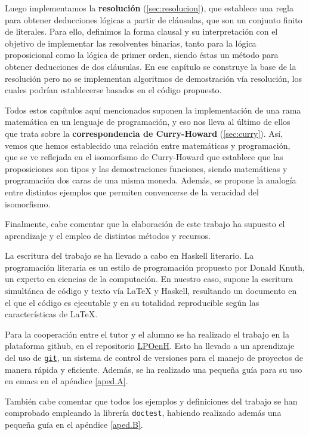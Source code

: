 Luego implementamos la \textbf{resolución} (\ref{sec:resolucion}), que establece una regla para obtener deducciones lógicas a partir de cláusulas, que son un conjunto finito de literales. Para ello, definimos la forma clausal y su interpretación con el objetivo de implementar las resolventes binarias, tanto para la lógica proposicional como la lógica de primer orden, siendo éstas un método para obtener deducciones de dos cláusulas. En ese capítulo se construye la base de la resolución pero no se
implementan algoritmos de demostración vía resolución, los cuales podrían establecerse
basados en el código propuesto. 
  
Todos estos capítulos aquí mencionados suponen la implementación de una rama matemática
en un lenguaje de programación, y eso nos lleva al último de ellos que trata sobre
la \textbf{correspondencia de Curry-Howard} (\ref{sec:curry}). Así, vemos que hemos
establecido una relación entre matemáticas y programación, que se ve reflejada
en el isomorfismo de Curry-Howard que establece que las proposiciones son tipos y
las demostraciones funciones, siendo matemáticas y programación dos caras de una misma
moneda. Además, se propone la analogía entre distintos ejemplos que permiten convencerse
de la veracidad del isomorfismo. 

\vspace{3mm}

Finalmente, cabe comentar que la elaboración de este trabajo ha supuesto el aprendizaje
y el empleo de distintos métodos y recursos.

La escritura del trabajo se ha llevado a cabo en Haskell literario. La programación
literaria es un estilo de programación propuesto por Donald Knuth, un experto en
ciencias de la computación. En nuestro caso, supone la escritura simultánea de código
y texto vía LaTeX y Haskell, resultando un documento en el que el código es ejecutable
y en su totalidad reproducible según las características de LaTeX. 

Para la cooperación entre el tutor y el alumno se ha realizado el trabajo en la plataforma
github, en el repositorio \href{https://github.com/EduPH/LPOenH}{LPOenH}. Esto ha
llevado a un aprendizaje del uso de \href{https://git-scm.com/}{\texttt{git}}, un sistema de control de versiones
para el manejo de proyectos de manera rápida y eficiente. Además, se ha realizado una pequeña guía para su uso en emacs en el apéndice \ref{aped.A}.

También cabe comentar que todos los ejemplos y definiciones del trabajo se han comprobado empleando la librería
\texttt{doctest}, habiendo realizado además una pequeña guía en el apéndice \ref{aped.B}.


